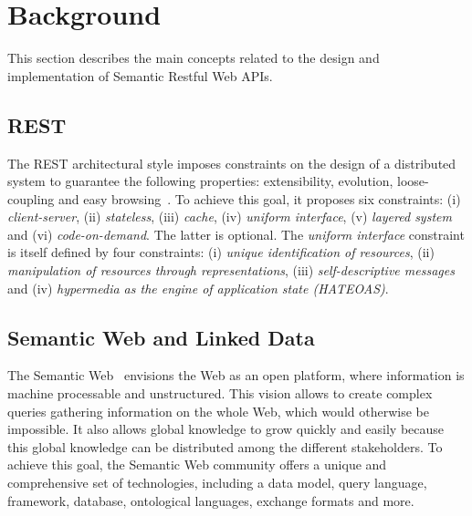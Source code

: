 \section{Background} \label{sec:background}




This section describes the main concepts related to the design and implementation of Semantic Restful Web APIs.

\subsection{REST}

The REST architectural style imposes constraints on the design of a distributed system to guarantee the following properties: extensibility, evolution, loose-coupling and easy browsing~\cite{FieldingThesis}. To achieve this goal, it proposes six constraints: (i) \textit{client-server}, (ii) \textit{stateless}, (iii) \textit{cache}, (iv) \textit{uniform interface}, (v) \textit{layered system} and (vi) \textit{code-on-demand}. The latter is optional. The \textit{uniform interface} constraint is itself defined by four constraints: (i) \textit{unique identification of resources}, (ii) \textit{manipulation of resources through representations}, (iii) \textit{self-descriptive messages} and (iv) \textit{hypermedia as the engine of application state (HATEOAS)}.

\subsection{Semantic Web and Linked Data}

The Semantic Web~\cite{TheSemanticWeb} envisions the Web as an open platform, where information is machine processable and unstructured. This vision allows to create complex queries gathering information on the whole Web, which would otherwise be impossible.  It also allows global knowledge to grow quickly and easily because this global knowledge can be distributed among the different stakeholders. To achieve this goal, the Semantic Web community offers a unique and comprehensive set of technologies, including a data model, query language, framework, database, ontological languages, exchange formats and more.

